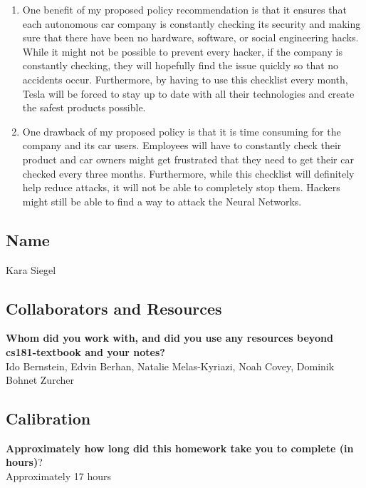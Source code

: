 \documentclass[submit]{harvardml}
\begin{document}
\begin{enumerate}
\begin{enumerate}
        \item One benefit of my proposed policy recommendation is that it ensures that each autonomous car company is constantly checking its security and making sure that there have been no hardware, software, or social engineering hacks. While it might not be possible to prevent every hacker, if the company is constantly checking, they will hopefully find the issue quickly so that no accidents occur. Furthermore, by having to use this checklist every month, Tesla will be forced to stay up to date with all their technologies and create the safest products possible.\\
        \item One drawback of my proposed policy is that it is time consuming for the company and its car users. Employees will have to constantly check their product and car owners might get frustrated that they need to get their car checked every three months. Furthermore, while this checklist will definitely help reduce attacks, it will not be able to completely stop them. Hackers might still be able to find a way to attack the Neural Networks.
    \end{enumerate}
\end{enumerate}

\newpage

\subsection*{Name} Kara Siegel

\subsection*{Collaborators and Resources}
\textbf{Whom did you work with, and did you use any resources beyond cs181-textbook and your notes?}\\
Ido Bernstein, Edvin Berhan, Natalie Melas-Kyriazi, Noah Covey, Dominik Bohnet Zurcher 

\subsection*{Calibration}
\textbf{Approximately how long did this homework take you to complete (in hours)}? \\
Approximately 17 hours
\end{document}
